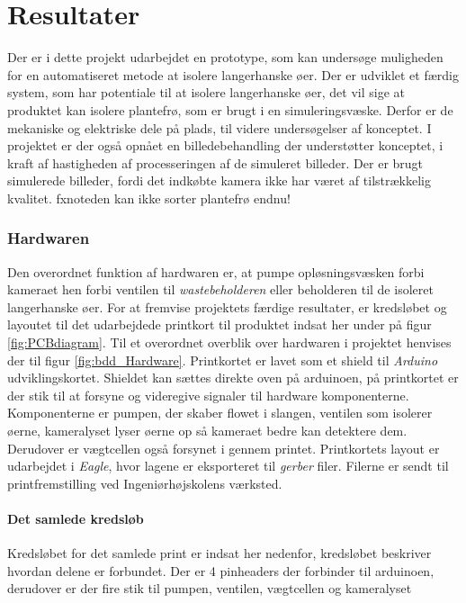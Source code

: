 \chapter{Resultater}

Der er i dette projekt udarbejdet en prototype, som kan undersøge muligheden for en automatiseret metode at isolere langerhanske øer. Der er udviklet et færdig system, som har potentiale til at isolere langerhanske øer, det vil sige at produktet kan isolere plantefrø, som er brugt i en simuleringsvæske. Derfor er de mekaniske og elektriske dele på plads, til videre undersøgelser af konceptet. I projektet er der også opnået en billedebehandling der understøtter konceptet, i kraft af hastigheden af processeringen af de simuleret billeder. Der er brugt simulerede billeder, fordi det indkøbte kamera ikke har været af tilstrækkelig kvalitet. fxnote{den kan ikke sorter plantefrø endnu!}



\subsection{Hardwaren}

Den overordnet funktion af hardwaren er, at pumpe opløsningsvæsken forbi kameraet hen forbi ventilen til \textit{wastebeholderen} eller beholderen til de isoleret langerhanske øer. For at fremvise projektets færdige resultater, er kredsløbet og layoutet til det udarbejdede printkort til produktet indsat her under på figur \ref{fig:PCBdiagram}. Til et overordnet overblik over hardwaren i projektet henvises der til figur \ref{fig:bdd_Hardware}. Printkortet er lavet som et shield til \textit{Arduino} udviklingskortet. Shieldet kan sættes direkte oven på arduinoen, på printkortet er der stik til at forsyne og videregive signaler til hardware komponenterne. Komponenterne er pumpen, der skaber flowet i slangen, ventilen som isolerer øerne, kameralyset lyser øerne op så kameraet bedre kan detektere dem. Derudover er vægtcellen også forsynet i gennem printet. Printkortets layout er udarbejdet i \textit{Eagle}, hvor lagene er eksporteret til \textit{gerber} filer. Filerne er sendt til printfremstilling ved Ingeniørhøjskolens værksted.

\newpage
\subsubsection{Det samlede kredsløb}

Kredsløbet for det samlede print er indsat her nedenfor, kredsløbet beskriver hvordan delene er forbundet. Der er 4 pinheaders der forbinder til arduinoen, derudover er der fire stik til pumpen, ventilen, vægtcellen og kameralyset 

